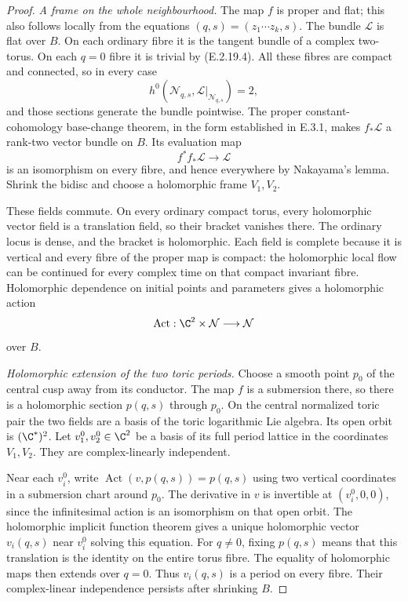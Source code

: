 \begin{proof}
\emph{A frame on the whole neighbourhood.}
The map $f$ is proper and flat; this
also follows locally from the equations
$(q,s)=(z_1\cdots z_k,s)$.
The bundle $\mathcal L$ is flat over
$B$.  On each ordinary fibre it is
the tangent bundle of a complex
two-torus.  On each $q=0$ fibre it
is trivial by (E.2.19.4).  All these
fibres are compact and connected,
so in every case
\[
 h^0(\mathcal N_{q,s},
       \mathcal L|_{\mathcal N_{q,s}})=2,
\]
and those sections generate the
bundle pointwise.  The proper
constant-cohomology base-change
theorem, in the form established
in E.3.1, makes $f_*\mathcal L$
a rank-two vector bundle on $B$.
Its evaluation map
\[
 f^*f_*\mathcal L\longrightarrow\mathcal L
 \tag{E.2.19.5}
\]
is an isomorphism on every fibre,
and hence everywhere by Nakayama's
lemma.  Shrink the bidisc and
choose a holomorphic frame $V_1,V_2$.

These fields commute.  On every
ordinary compact torus, every
holomorphic vector field is a
translation field, so their
bracket vanishes there.  The
ordinary locus is dense, and
the bracket is holomorphic.
Each field is complete because
it is vertical and every fibre
of the proper map is compact:
the holomorphic local flow can
be continued for every complex
time on that compact invariant
fibre.  Holomorphic dependence
on initial points and parameters
gives a holomorphic action
\[
 \operatorname{Act}:\C^2\times
       \mathcal N\longrightarrow\mathcal N
\]
over $B$.

\emph{Holomorphic extension of the two toric periods.}
Choose a smooth point $p_0$ of the
central cusp away from its conductor.
The map $f$ is a submersion there,
so there is a holomorphic section
$p(q,s)$ through $p_0$.
On the central normalized toric
pair the two fields are a basis
of the toric logarithmic Lie
algebra.  Its open orbit is
$(\C^*)^2$.  Let
$v_1^0,v_2^0\in\C^2$ be a
basis of its full period lattice
in the coordinates $V_1,V_2$.
They are complex-linearly
independent.

Near each $v_i^0$, write
$\operatorname{Act}(v,p(q,s))=p(q,s)$
using two vertical coordinates
in a submersion chart around
$p_0$.  The derivative in $v$
is invertible at $(v_i^0,0,0)$,
since the infinitesimal action
is an isomorphism on that open
orbit.  The holomorphic implicit
function theorem gives a unique
holomorphic vector $v_i(q,s)$
near $v_i^0$ solving this equation.
For $q\ne0$, fixing $p(q,s)$
means that this translation is
the identity on the entire
torus fibre.  The equality of
holomorphic maps then extends
over $q=0$.  Thus $v_i(q,s)$
is a period on every fibre.
Their complex-linear
independence persists after
shrinking $B$.


\end{proof}
